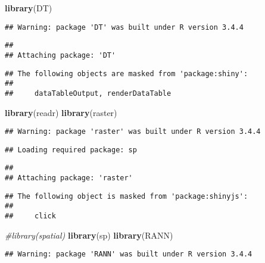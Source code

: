 \documentclass[]{article}
\newenvironment{Shaded}{\begin{snugshade}}{\end{snugshade}}
\newcommand{\KeywordTok}[1]{\textcolor[rgb]{0.13,0.29,0.53}{\textbf{#1}}}
\newcommand{\CommentTok}[1]{\textcolor[rgb]{0.56,0.35,0.01}{\textit{#1}}}
\newcommand{\NormalTok}[1]{#1}
\begin{document}
\begin{Shaded}
\begin{Highlighting}[]
\KeywordTok{library}\NormalTok{(DT)}
\end{Highlighting}
\end{Shaded}

\begin{verbatim}
## Warning: package 'DT' was built under R version 3.4.4
\end{verbatim}

\begin{verbatim}
## 
## Attaching package: 'DT'
\end{verbatim}

\begin{verbatim}
## The following objects are masked from 'package:shiny':
## 
##     dataTableOutput, renderDataTable
\end{verbatim}

\begin{Shaded}
\begin{Highlighting}[]
\KeywordTok{library}\NormalTok{(readr)}
\KeywordTok{library}\NormalTok{(raster)}
\end{Highlighting}
\end{Shaded}

\begin{verbatim}
## Warning: package 'raster' was built under R version 3.4.4
\end{verbatim}

\begin{verbatim}
## Loading required package: sp
\end{verbatim}

\begin{verbatim}
## 
## Attaching package: 'raster'
\end{verbatim}

\begin{verbatim}
## The following object is masked from 'package:shinyjs':
## 
##     click
\end{verbatim}

\begin{Shaded}
\begin{Highlighting}[]
\CommentTok{#library(spatial)}
\KeywordTok{library}\NormalTok{(sp)}
\KeywordTok{library}\NormalTok{(RANN)}
\end{Highlighting}
\end{Shaded}

\begin{verbatim}
## Warning: package 'RANN' was built under R version 3.4.4
\end{verbatim}
\end{document}
